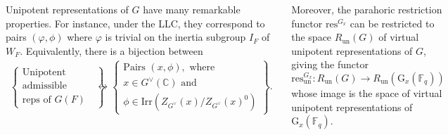 \documentclass[25pt, a0paper, landscape]{tikzposter}
\newcommand{\Fq}{\mathbb{F}_q}
\newcommand{\CC}{\mathbb{C}}
\theoremstyle{definition}
\begin{document}
\begin{columns}
{        Unipotent representations of $G$ have many remarkable properties. For instance, under the LLC, they correspond to pairs $(\varphi,\phi)$ where $\varphi$ is trivial on the inertia subgroup $I_F$ of $W_F$. Equivalently, there is a bijection between
        \begin{align*}
            \left\{
            \begin{array}{c}
                \text{Unipotent irreducible} \\
                \text{admissible complex} \\
                \text{reps of } G(F)
            \end{array}
            \right\} 
            &\leftrightarrow
            \left\{
            \begin{array}{c}
                \text{Pairs } (x,\phi), \text{ where}\\
                x\in G^\vee(\CC)\text{ and}\\
                \phi \in \mathrm{Irr}\left(Z_{G^\vee}(x)/Z_{G^\vee}(x)^0\right)
            \end{array}
            \right\}.
        \end{align*}

        Moreover, the parahoric restriction functor $\mathrm{res}^{G_x}$ can be restricted to the space $R_{\mathrm{un}}(G)$ of virtual unipotent representations of $G$, giving the functor
        $$\mathrm{res}_{\mathrm{un}}^{G_x}: R_{\mathrm{un}}(G) \longrightarrow R_{\mathrm{un}}(\mathrm{G}_x(\Fq))$$
        whose image is the space of virtual unipotent representations of $\mathrm{G}_x(\Fq)$.
         

    }


\end{columns}
\end{document}

